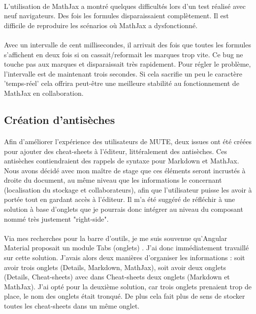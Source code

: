 \documentclass[12pt]{article}
\begin{document}
\paragraph{}
L'utilisation de MathJax a montré quelques difficultés lors d'un test réalisé avec neuf navigateurs. Des fois les formules disparaissaient complètement. Il est difficile de reproduire les scénarios où MathJax a dysfonctionné.
\paragraph{}
Avec un intervalle de cent millisecondes, il arrivait des fois que toutes les formules s'affichent en deux fois si on cassait/reformait les marques trop vite. Ce bug ne touche pas aux marques et disparaissait très rapidement. Pour régler le problème, l'intervalle est de maintenant trois secondes. Si cela sacrifie un peu le caractère 'temps-réel' cela offrira peut-être une meilleure stabilité au fonctionnement de MathJax en collaboration.

\newpage
\subsection{Création d'antisèches}
\paragraph{}
Afin d'améliorer l'expérience des utilisateurs de MUTE, deux issues ont été créées pour ajouter des cheat-sheets à l'éditeur, littéralement des antisèches. Ces antisèches contiendraient des rappels de syntaxe pour Markdown et MathJax. Nous avons décidé avec mon maître de stage que ces éléments seront incrustés à droite du document, au même niveau que les informations le concernant (localisation du stockage et collaborateurs), afin que l'utilisateur puisse les avoir à portée tout en gardant accès à l'éditeur. Il m'a été suggéré de réfléchir à une solution à base d'onglets que je pourrais donc intégrer au niveau du composant nommé très justement "right-side".
\paragraph{}
Via mes recherches pour la barre d'outils, je me suis souvenue qu'Angular Material proposait un module Tabs (onglets) \cite{tabs}. J'ai donc immédiatement travaillé sur cette solution. J'avais alors deux manières d'organiser les informations : soit avoir trois onglets (Details, Markdown, MathJax), soit avoir deux onglets (Details, Cheat-sheets) avec dans Cheat-sheets deux onglets (Markdown et MathJax). J'ai opté pour la deuxième solution, car trois onglets prenaient trop de place, le nom des onglets était tronqué. De plus cela fait plus de sens de stocker toutes les cheat-sheets dans un même onglet.\\
\end{document}
